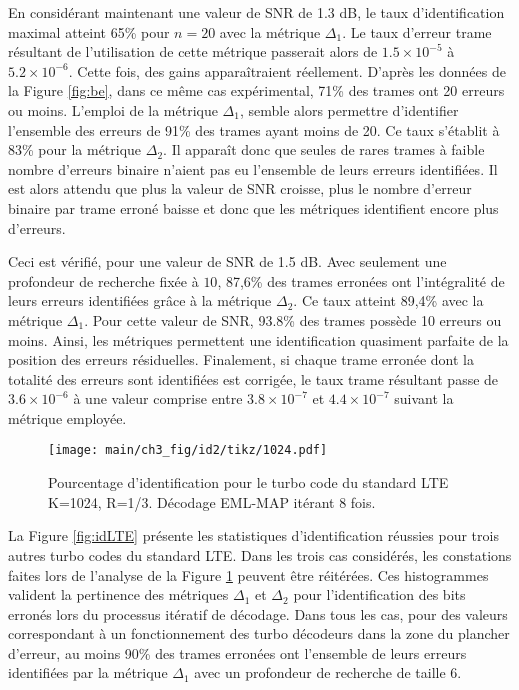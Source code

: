 En considérant maintenant une valeur de SNR de 1.3 dB, le taux d'identification maximal atteint 65\% pour $n=20$ avec la 
métrique $\Delta_1$. Le taux d'erreur trame résultant de l'utilisation de cette métrique passerait alors de 
$1.5\times 10^{-5}$ à $5.2\times 10^{-6}$. Cette fois, des gains apparaîtraient réellement. D'après les données de la 
Figure \ref{fig:be}, dans ce même cas expérimental, 71\% des trames ont 20 erreurs ou moins. 
L'emploi de la métrique $\Delta_1$, semble alors permettre d'identifier l'ensemble des erreurs de 91\% des trames ayant 
moins de 20. Ce taux s'établit à 83\% pour la métrique $\Delta_2$. 
Il apparaît donc que seules de rares trames à faible nombre d'erreurs binaire n'aient pas eu l'ensemble de leurs erreurs
identifiées. Il est alors attendu que plus la valeur de SNR croisse, plus le nombre d'erreur binaire par trame erroné 
baisse et donc que les métriques identifient encore plus d'erreurs.

Ceci est vérifié, pour une valeur de SNR de 1.5 dB. Avec seulement une profondeur de recherche fixée à $10$, 87,6\% des 
trames erronées ont l'intégralité de leurs erreurs identifiées grâce à la métrique $\Delta_2$. Ce taux atteint 89,4\% avec 
la métrique $\Delta_1$. Pour cette valeur de SNR, 93.8\% des trames possède 10 erreurs ou moins. Ainsi, les métriques 
permettent une identification quasiment parfaite de la position des erreurs résiduelles. Finalement, si chaque trame 
erronée dont la totalité des erreurs sont identifiées est corrigée, le taux trame résultant passe de 
$3.6\times 10^{-6}$ à une valeur comprise entre $3.8\times 10^{-7}$ et $4.4\times 10^{-7}$ suivant la métrique employée.

\begin{figure}[!htb]
	\centering
	\texttt{[image: main/ch3\_fig/id2/tikz/1024.pdf]}
	\caption{Pourcentage d'identification pour le turbo code du standard LTE K=1024, R=1/3.
	Décodage EML-MAP itérant 8 fois. \label{fig:id1024}}
		\vspace*{-1cm}
\end{figure}
\newpage
La Figure \ref{fig:idLTE} présente les statistiques d'identification réussies pour trois autres turbo codes du standard 
LTE. Dans les trois cas considérés, les constations faites lors de l'analyse de la Figure \ref{fig:id1024} peuvent être 
réitérées. Ces histogrammes valident la pertinence des métriques $\Delta_1$ et $\Delta_2$ pour l'identification des bits 
erronés lors du processus itératif de décodage. Dans tous les cas, pour des valeurs correspondant à un fonctionnement des 
turbo décodeurs dans la zone du plancher d'erreur, au moins 90\% des trames erronées ont l'ensemble de leurs erreurs 
identifiées par la métrique $\Delta_1$ avec un profondeur de recherche de taille 6.

